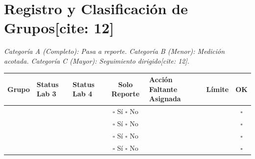 \documentclass[11pt, a4paper]{article}
\begin{document}
\vspace{0.5cm}
\section*{Registro y Clasificación de Grupos[cite: 12]}
\textit{Categoría A (Completo): Pasa a reporte. Categoría B (Menor): Medición acotada. Categoría C (Mayor): Seguimiento dirigido[cite: 12].}

\begin{table}[h!]
    \centering
    \footnotesize
    \renewcommand{\arraystretch}{1.5}
    \begin{tabularx}{\textwidth}{|c|>{\raggedright\arraybackslash\hsize=0.8\hsize}X|>{\raggedright\arraybackslash\hsize=0.8\hsize}X|c|>{\raggedright\arraybackslash\hsize=1.4\hsize}X|c|c|}
    \hline
    \rowcolor[HTML]{EFEFEF}
    \textbf{Grupo} & \textbf{Status Lab 3} & \textbf{Status Lab 4} & \textbf{Solo Reporte} & \textbf{Acción Faltante Asignada} & \textbf{Límite} & \textbf{OK} \\ \hline
    & & & $\square$ Sí $\square$ No & & & $\square$ \\ \hline
    & & & $\square$ Sí $\square$ No & & & $\square$ \\ \hline
    & & & $\square$ Sí $\square$ No & & & $\square$ \\ \hline
    & & & $\square$ Sí $\square$ No & & & $\square$ \\ \hline
    \end{tabularx}
\end{table}
\end{document}

